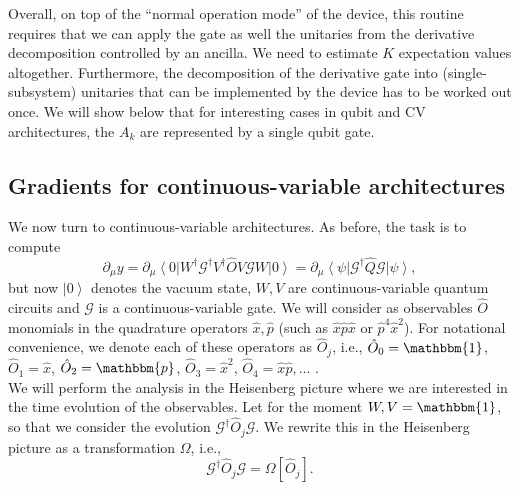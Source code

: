 \documentclass[aps,pra,10pt,twocolumn,groupedaddress,nofootinbib]{revtex4-1}
\theoremstyle{plain}
\newcommand{\ket}[1]{\ensuremath{\left| #1 \right \rangle}}
\newcommand{\bra}[1]{\ensuremath{\left \langle #1 \right |}}
\newcommand{\x}{\hat{x}}
\newcommand{\p}{\hat{p}}
\newcommand{\G}{\mathcal{G}}
\begin{document}
Overall, on top of the ``normal operation mode'' of the device, this routine requires that we can apply the gate as well the unitaries from the derivative decomposition controlled by an ancilla. We need to estimate $K$ expectation values altogether. Furthermore, the decomposition of the derivative gate into (single-subsystem)  unitaries that can be implemented by the device has to be worked out once. We will show below that for interesting cases in qubit and CV architectures, the $A_k$ are represented by a single qubit gate.


\subsection{Gradients for continuous-variable architectures}

We now turn to continuous-variable architectures. As before, the task is to compute 
\[\partial_{\mu}y = \partial_{\mu} \bra{0}W^{\dagger} \G^{\dagger} V^{\dagger} \hat{O}V \G W \ket{0} = \partial_{\mu} \bra{\psi} \G^{\dagger} \hat{Q} \G \ket{\psi},  \]
but now  $\ket{0}$ denotes the vacuum state, $W, V$ are continuous-variable quantum circuits and $\G$ is a continuous-variable gate. We will consider as observables $\hat{O}$ monomials in the quadrature operators $\x, \p$ (such as $\x \p \x$ or $\p^4 \x^2$). For notational convenience, we denote each of these operators as $\hat{O}_j$, i.e., $\hat{O}_0 = \mathbbm{1}$, $\hat{O}_1 = \x$, $\hat{O}_2 = \mathbbm{p}$, $\hat{O}_3 = \x^2$, $\hat{O}_4 = \x \p,...$ .\\

We will perform the analysis in the Heisenberg picture where we are interested in the time  evolution of the observables. Let for the moment $W,V=\mathbbm{1}$, so that we consider the evolution $\G^{\dagger} \hat{O}_j \G$. We rewrite this in the Heisenberg picture as a transformation $\Omega$, i.e.,
\begin{equation}
 \mathcal{G}^\dagger \hat{O}_j \mathcal{G} = \Omega[\hat{O}_j].
\end{equation}
\end{document}
